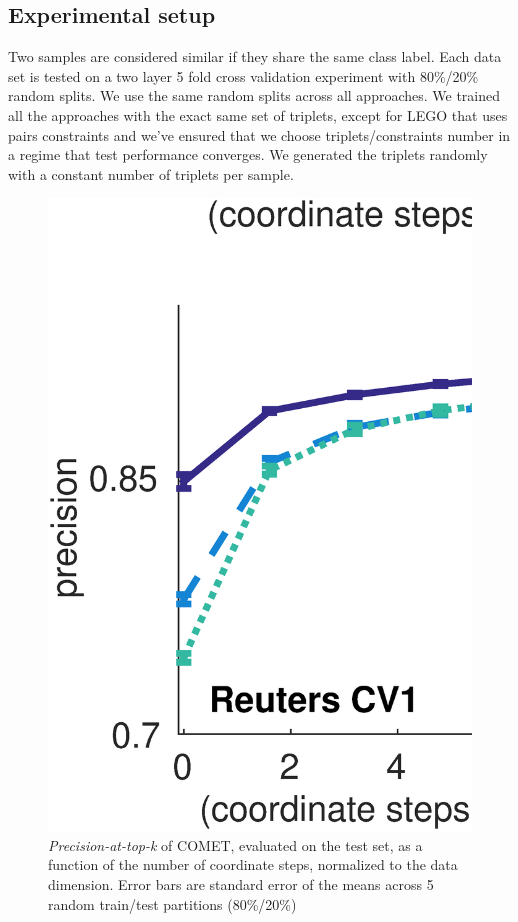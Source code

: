 \documentclass{article}
\begin{document}
{\subsection{Experimental setup}
Two samples are considered similar if they share the same class label. Each data set is tested on a two layer 5 fold cross validation experiment with 80\%/20\% random splits. We use the same random splits across all approaches. We trained all the approaches with the exact same set of triplets, except for LEGO that uses pairs constraints and we've ensured that we choose triplets/constraints number in a regime that test performance converges. We generated the triplets randomly with a constant number of triplets per sample.

\begin{figure}[t]
\vskip 0.2in
\begin{center}
\centerline{\includegraphics[width=\columnwidth]{COMET_convergence}}
\caption{ \textit{Precision-at-top-k} of COMET, evaluated on the test set, as a function of the number of coordinate steps, normalized to the data dimension. Error bars are standard error of the means across 5 random train/test partitions (80\%/20\%) }
\label{cometConvergeFig}
\end{center}
\vskip -0.2in
\end{figure} 

}
\end{document}
